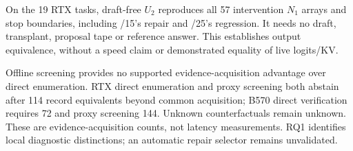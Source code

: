 On the 19 RTX tasks, draft-free $U_2$ reproduces all 57 intervention $N_1$ arrays and stop boundaries, including /15's repair and /25's regression. It needs no draft, transplant, proposal tape or reference answer. This establishes output equivalence, without a speed claim or demonstrated equality of live logits/KV.

Offline screening provides no supported evidence-acquisition advantage over direct enumeration. RTX direct enumeration and proxy screening both abstain after 114 record equivalents beyond common acquisition; B570 direct verification requires 72 and proxy screening 144. Unknown counterfactuals remain unknown. These are evidence-acquisition counts, not latency measurements. RQ1 identifies local diagnostic distinctions; an automatic repair selector remains unvalidated.
